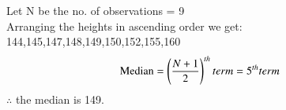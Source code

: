 Let N be the no. of observations = 9\\
Arranging the heights in ascending order we get:\\
144,145,147,148,149,150,152,155,160\\


	\begin{align}
	\text{Median} &= \left(\frac{N+1}{2}\right)^{th} term = 5^{th}term
	\end{align}
		$\therefore$ the median is 149.
		
